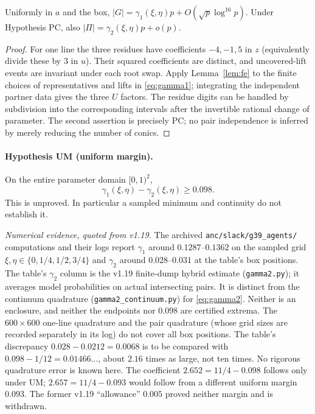 

\begin{proposition}\label{prop:counts}
Uniformly in $a$ and the box, $|G|=\gamma_1(\xi,\eta)p+O(\sqrt p\log^{16}p)$.
Under Hypothesis PC, also $|\Pi|=\gamma_2(\xi,\eta)p+o(p)$.
\end{proposition}
\begin{proof}
For one line the three residues have coefficients $-4,-1,5$ in $z$ (equivalently divide these by $3$ in $u$).
Their squared coefficients are distinct, and uncovered-lift events are invariant under each root swap.
Apply Lemma~\ref{lem:fe} to the finite choices of representatives and lifts in \eqref{eq:gamma1}; integrating the independent partner data gives the three $U$ factors.
The residue digits can be handled by subdivision into the corresponding intervals after the invertible rational change of parameter.
The second assertion is precisely PC; no pair independence is inferred by merely reducing the number of conics.
\end{proof}

\paragraph{Hypothesis UM (uniform margin).}\label{hyp:margin}
On the entire parameter domain $[0,1)^2$,
\begin{equation}\label{eq:margin}
 \gamma_1(\xi,\eta)-\gamma_2(\xi,\eta)\ge0.098.
\end{equation}
This is unproved.  In particular a sampled minimum and continuity do not establish it.

\emph{Numerical evidence, quoted from v1.19.}
The archived \texttt{anc/slack/g39\_agents/} computations and their logs report $\gamma_1$ around $0.1287$--$0.1362$
on the sampled grid $\xi,\eta\in\{0,1/4,1/2,3/4\}$ and $\gamma_2$ around $0.028$--$0.031$ at the table's box positions.
The table's $\gamma_2$ column is the v1.19 finite-dump hybrid estimate (\texttt{gamma2.py}); it averages model probabilities on actual intersecting pairs.  It is distinct from the continuum quadrature (\texttt{gamma2\_continuum.py}) for \eqref{eq:gamma2}.  Neither is an enclosure, and neither the endpoints nor $0.098$ are certified extrema.
The $600\times600$ one-line quadrature and the pair quadrature (whose grid sizes are recorded separately in its log) do not cover all box positions.
The table's discrepancy $0.028-0.0212=0.0068$ is to be compared with $0.098-1/12=0.01466\ldots$, about $2.16$ times as large,
not ten times.  No rigorous quadrature error is known here.
The coefficient $2.652=11/4-0.098$ follows only under UM;
$2.657=11/4-0.093$ would follow from a different uniform margin $0.093$.
The former v1.19 ``allowance'' $0.005$ proved neither margin and is withdrawn.

